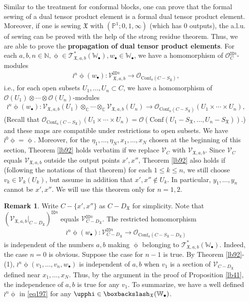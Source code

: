 \documentclass[12pt,a4paper,notitlepage]{report}
\theoremstyle{definition}
\newtheorem{rem}[df]{Remark}
\theoremstyle{plain}
\newcommand{\fk}{\mathfrak}
\newcommand{\Conf}{\mathrm{Conf}}
\newcommand{\scr}{\mathscr}
\newcommand{\SX}{S_{\fk X}}
\newcommand{\DX}{D_{\fk X}}
\newcommand{\blt}{\bullet}
\newcommand{\Wbb}{\mathbb W}
\newcommand{\Cbb}{\mathbb C}
\newcommand{\Nbb}{\mathbb N}
\newcommand{\Pbb}{\mathbb P}
\numberwithin{equation}{section}
\begin{document}
Similar to the treatment for conformal blocks, one can prove that the formal sewing of a dual tensor product element is a formal dual tensor product element. Moreover, if one is sewing $\fk X$ with  $(\Pbb^1;0,1,\infty)$ (which has $0$ outputs), the a.l.u. of sewing can be proved with the help of the strong residue theorem. Thus, we are able to prove the \textbf{propagation of dual tensor product elements}.  For each $a,b,n\in\Nbb,\upphi\in\scr T_{\fk X,a,b}^*(\Wbb_\blt),w_\blt\in\Wbb_\blt$, we have a homomorphism of $\scr O_C^{\boxtimes n}$-modules
\begin{gather*}
\wr^n\upphi(w_\blt):\scr V_{\fk X,a,b}^{\boxtimes n}\rightarrow\scr O_{\Conf_n(C-\SX)},
\end{gather*}
i.e., for each open subsets $U_1,\dots,U_n\subset C$, we have a homomorphism of $\scr O(U_1)\otimes\cdots\otimes\scr O(U_n)$-modules
\begin{gather*}
\wr^n\upphi(w_\blt):\scr V_{\fk X,a,b}(U_1)\otimes_\Cbb\cdots\otimes_\Cbb\scr V_{\fk X,a,b}(U_n)\rightarrow\scr O_{\Conf_n(C-\SX)}(U_1\times\cdots\times U_n),
\end{gather*}
(Recall that $\scr O_{\Conf_n(C-\SX)}(U_1\times\cdots\times U_n)=\scr O(\Conf(U_1-\SX,\dots,U_n-\SX))$.) and these maps are compatible under restrictions to open subsets. We have $\wr^0\upphi=\upphi$. Moreover, for the $\eta_1,\dots,\eta_N,x_1,\dots,x_N$ chosen at the beginning of this section, Theorem \ref{lb92} holds verbatim if we replace $\scr V_C$ with $\scr V_{\fk X,a,b}$. Since $\scr V_C$ equals $\scr V_{\fk X,a,b}$ outside the output points $x',x''$, Theorem \ref{lb92} also holds if (following the notations of that theorem) for each $1\leq k\leq n$, we still choose $v_k\in\scr V_k(U_k)$, but assume in addition that $x',x''\notin U_k$. In particular, $y_1,\dots,y_n$ cannot be $x',x''$. We will use this theorem only for $n=1,2$.


\begin{rem}
Write $C-\{x',x''\}$ as $C-\DX$ for simplicity. Note that $(\scr V_{\fk X,a,b}|_{C-\DX})^{\boxtimes n}$ equals $\scr V_{C-\DX}^{\boxtimes n}$. The restricted homomorphism
\begin{gather}
\wr^n\upphi(w_\blt):\scr V_{C-\DX}^{\boxtimes n}\rightarrow\scr O_{\Conf_n(C-\SX-\DX)}\label{eq197}
\end{gather} 
is independent of the numbers $a,b$ making $\upphi$ belonging to $\scr T_{\fk X,a,b}^*(\Wbb_\blt)$. Indeed, the case $n=0$ is obvious. Suppose the case for $n-1$ is true.  By  Theorem \ref{lb92}-(1), $\wr^n\upphi(v_1,\dots,v_n,w_\blt)$ is independent of $a,b$ when $v_1$ is a section of $\scr V_{C-\DX}$ defined near $x_1,\dots,x_N$.  Thus, by the argument in the proof of Proposition \ref{lb41}, the independence of $a,b$ is true for any $v_1$. To summarize, we have a well defined $\wr^n\upphi$ in \eqref{eq197} for any $\upphi\in\boxbackslash_{\fk X}(\Wbb_\blt)$. 
\end{rem}
\end{document}
